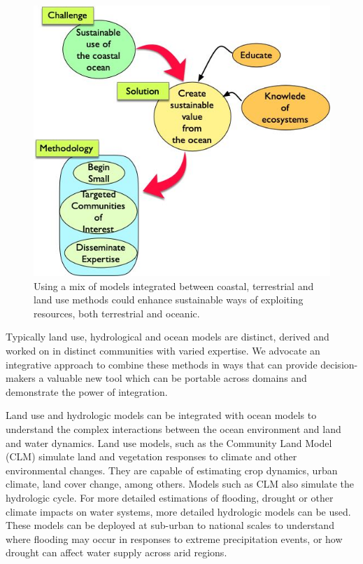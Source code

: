 \begin{figure}
  \centering
  \includegraphics[scale=0.40]{fig/Ericeira-method.jpg}
  \caption{Using a mix of models integrated between coastal, terrestrial
    and land use methods could enhance sustainable ways of exploiting
    resources, both terrestrial and oceanic.}
  \label{fig:method}
\end{figure}

Typically land use, hydrological and ocean models are distinct,
derived and worked on in distinct communities with varied expertise.
We advocate an integrative approach to combine these methods in ways
that can provide decision-makers a valuable new tool which can be
portable across domains and demonstrate the power of integration.

Land use and hydrologic models can be integrated with ocean models to
understand the complex interactions between the ocean environment and
land and water dynamics. Land use models, such as the Community Land
Model (CLM) simulate land and vegetation responses to climate and
other environmental changes. They are capable of estimating crop
dynamics, urban climate, land cover change, among others. Models such
as CLM also simulate the hydrologic cycle. For more detailed
estimations of flooding, drought or other climate impacts on water
systems, more detailed hydrologic models can be used. These models can
be deployed at sub-urban to national scales to understand where
flooding may occur in responses to extreme precipitation events, or
how drought can affect water supply across arid regions.




